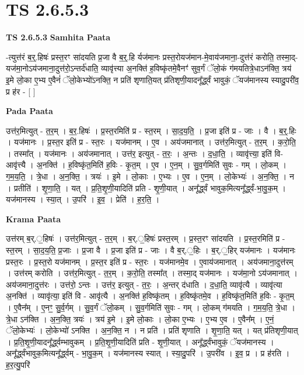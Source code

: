 \documentclass[17pt]{extarticle}
\begin{document}
\section*{ TS 2.6.5.3 }

\textbf{TS 2.6.5.3 } \newline
\textbf{Samhita Paata} \newline

-त्युत्त॑रं ब॒र्॒.हिषः॑ प्रस्त॒रꣳ सा॑दयति प्र॒जा वै ब॒र्॒.हि र्यज॑मानः प्रस्त॒रोयज॑मान-मे॒वाय॑जमाना॒-दुत्त॑रं करोति॒ तस्मा॒द्-यज॑मा॒नोऽय॑जमाना॒दुत्त॑रो॒ऽन्तर्द॑धाति॒ व्यावृ॑त्त्या अ॒नक्ति॑ ह॒विष्कृ॑तमे॒वैनꣳ॑ सुव॒र्गं ॅलो॒कं ग॑मयतित्रे॒धाऽन॑क्ति॒ त्रय॑ इ॒मे लो॒का ए॒भ्य ए॒वैनं॑ ॅलो॒केभ्यो॑ऽनक्ति॒ न प्रति॑ शृणाति॒यत् प्र॑तिशृणी॒यादनू᳚र्द्ध्वं भावुकं॒ ॅयज॑मानस्य स्यादु॒परी॑व॒ प्र ह॑र - [  ] \newline

\textbf{Pada Paata} \newline

उत्त॑र॒मित्युत् - त॒र॒म् । ब॒र॒.हिषः॑ । प्र॒स्त॒रमिति॑ प्र - स्त॒रम् । सा॒द॒य॒ति॒ । प्र॒जा इति॑ प्र - जाः । वै । ब॒र्॒.हिः । यज॑मानः । प्र॒स्त॒र इति॑ प्र - स्त॒रः । यज॑मानम् । ए॒व । अय॑जमानात् । उत्त॑र॒मित्युत् - त॒र॒म् । क॒रो॒ति॒ । तस्मा᳚त् । यज॑मानः । अय॑जमानात् । उत्त॑र॒ इत्युत् - त॒रः॒ । अ॒न्तः । द॒धा॒ति॒ । व्यावृ॑त्त्या॒ इति॑ वि-आवृ॑त्त्यै । अ॒नक्ति॑ । ह॒विष्कृ॑त॒मिति॑ ह॒विः - कृ॒त॒म् । ए॒व । ए॒न॒म् । सु॒व॒र्गमिति॑ सुवः - गम् । लो॒कम् । ग॒म॒य॒ति॒ । त्रे॒धा । अ॒न॒क्ति॒ । त्रयः॑ । इ॒मे । लो॒काः । ए॒भ्यः । ए॒व । ए॒न॒म् । लो॒केभ्यः॑ । अ॒न॒क्ति॒ । न । प्रतीति॑ । शृ॒णा॒ति॒ । यत् । प्र॒ति॒शृ॒णी॒यादिति॑ प्रति - शृ॒णी॒यात् । अनू᳚र्द्ध्वं भावुक॒मित्यनू᳚र्द्ध्वं-भा॒वु॒क॒म् । यज॑मानस्य । स्या॒त् । उ॒परि॑ । इ॒व॒ । प्रेति॑ । ह॒र॒ति॒ ।  \newline


\textbf{Krama Paata} \newline

उत्त॑रम् ब॒र्.॒हिषः॑ । उत्त॑र॒मित्युत् - त॒र॒म् । ब॒र्.॒हिषः॑ प्रस्त॒रम् । प्र॒स्त॒रꣳ सा॑दयति । प्र॒स्त॒रमिति॑ प्र - स्त॒रम् । सा॒द॒य॒ति॒ प्र॒जाः । प्र॒जा वै । प्र॒जा इति॑ प्र - जाः । वै ब॒र्.॒हिः । ब॒र्.॒हिर् यज॑मानः । यज॑मानः प्रस्त॒रः । प्र॒स्त॒रो यज॑मानम् । प्र॒स्त॒र इति॑ प्र - स्त॒रः । यज॑मानमे॒व । ए॒वाय॑जमानात् । अय॑जमाना॒दुत्त॑रम् । उत्त॑रम् करोति । उत्त॑र॒मित्युत् - त॒र॒म् । क॒रो॒ति॒ तस्मा᳚त् । तस्मा॒द् यज॑मानः । यज॑मा॒नो ऽय॑जमानात् । अय॑जमाना॒दुत्त॑रः । उत्त॑रो॒ ऽन्तः । उत्त॑र॒ इत्युत् - त॒रः॒ । अ॒न्तर् द॑धाति । द॒धा॒ति॒ व्यावृ॑त्यै । व्यावृ॑त्या अ॒नक्ति॑ । व्यावृ॑त्या॒ इति॑ वि - आवृ॑त्यै । अ॒नक्ति॑ ह॒विष्कृ॑तम् । ह॒विष्कृ॑तमे॒व । ह॒विष्कृ॑त॒मिति॑ ह॒विः - कृ॒त॒म् । ए॒वैन᳚म् । ए॒नꣳ॒॒ सु॒र्व॒र्गम् । सु॒व॒र्गं ॅलो॒कम् । सु॒व॒र्गमिति॑ सुवः - गम् । लो॒कम् ग॑मयति । ग॒म॒य॒ति॒ त्रे॒धा । त्रे॒धा ऽन॑क्ति । अ॒न॒क्ति॒ त्रयः॑ । त्रय॑ इ॒मे । इ॒मे लो॒काः । लो॒का ए॒भ्यः । ए॒भ्य ए॒व । ए॒वैन᳚म् । ए॒नं॒ ॅलो॒केभ्यः॑ । लो॒केभ्यो॑ ऽनक्ति । अ॒न॒क्ति॒ न । न प्रति॑ । प्रति॑ शृणाति । शृ॒णा॒ति॒ यत् । यत् प्र॑तिशृणी॒यात् । प्र॒ति॒शृ॒णी॒यादनू᳚र्द्ध्वम्भावुकम् । प्र॒ति॒शृ॒णी॒यादिति॑ प्रति - शृ॒णी॒यात् । अनू᳚र्द्ध्वंभावुकं॒ ॅयज॑मानस्य । अनू᳚र्द्ध्वंभावुक॒मित्यनू᳚र्द्ध्वम् - भा॒वु॒क॒म् । यज॑मानस्य स्यात् । स्या॒दु॒परि॑ । उ॒परी॑व । इ॒व॒ प्र । प्र ह॑रति । ह॒र॒त्यु॒परि॑ \newline
\end{document}
